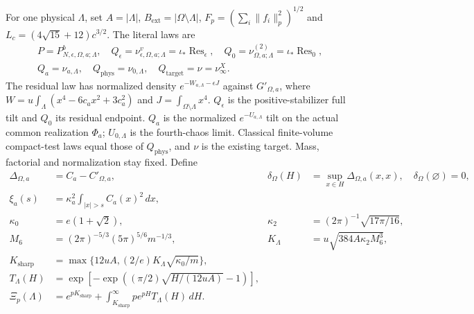 \documentclass[11pt]{article}
\theoremstyle{plain}
\theoremstyle{definition}
\theoremstyle{remark}
\begin{document}
For one physical $\Lambda$, set $A=|\Lambda|$,
$B_{\mathrm{ext}}=|\Omega\setminus\Lambda|$,
$F_p=(\sum_i\|f_i\|_p^2)^{1/2}$ and
$L_c=(4\sqrt{15}+12)c^{3/2}$. The literal laws are
\begin{gather*}
 P=P^b_{N,\epsilon,\Omega,a;\Lambda},\quad
 Q_\epsilon=\nu^v_{\epsilon,\Omega,a;\Lambda}=\iota_*\operatorname{Res}_\epsilon,
 \quad Q_0=\nu^{(2)}_{\Omega,a;\Lambda}=\iota_*\operatorname{Res}_0,\\
 Q_a=\nu_{a,\Lambda},\quad Q_{\mathrm{phys}}=\nu_{0,\Lambda},
 \quad Q_{\mathrm{target}}=\nu=\nu_\infty^X.
\end{gather*}
The residual law has normalized density $e^{-W_{a,\Lambda}-\epsilon J}$
against $G'_{\Omega,a}$, where
$W=u\int_\Lambda(x^4-6c_ax^2+3c_a^2)$ and
$J=\int_{\Omega\setminus\Lambda}x^4$.
$Q_\epsilon$ is the positive-stabilizer full tilt and $Q_0$ its residual
endpoint. $Q_a$ is the normalized $e^{-U_{a,\Lambda}}$ tilt on the actual
common realization $\Phi_a$; $U_{0,\Lambda}$ is the fourth-chaos limit.
Classical finite-volume compact-test laws equal those of $Q_{\mathrm{phys}}$,
and $\nu$ is the existing target. Mass, factorial and normalization stay fixed.
Define
\begin{align*}
 \Delta_{\Omega,a}&=C_a-C'_{\Omega,a},&
 \delta_\Omega(H)&=\sup_{x\in H}\Delta_{\Omega,a}(x,x),
 \quad\delta_\Omega(\varnothing)=0,\\
 \xi_a(s)&=\kappa_a^2\int_{|x|>s}C_a(x)^2\,dx,\\
 \kappa_0&=e(1+\sqrt2),&\kappa_2&=(2\pi)^{-1}\sqrt{17\pi/16},\\
 M_6&=(2\pi)^{-5/3}(5\pi)^{5/6}m^{-1/3},&
 K_\Lambda&=u\sqrt{384A\kappa_2M_6^3},\\
 K_{\mathrm{sharp}}&=\max\{12uA,(2/e)K_\Lambda\sqrt{\kappa_0/m}\},\\
 T_\Lambda(H)&=\exp[-\exp((\pi/2)\sqrt{H/(12uA)}-1)],\\
 \Xi_p(\Lambda)&=e^{pK_{\mathrm{sharp}}}
    +\int_{K_{\mathrm{sharp}}}^\infty pe^{pH}T_\Lambda(H)\,dH.
\end{align*}

\end{document}
